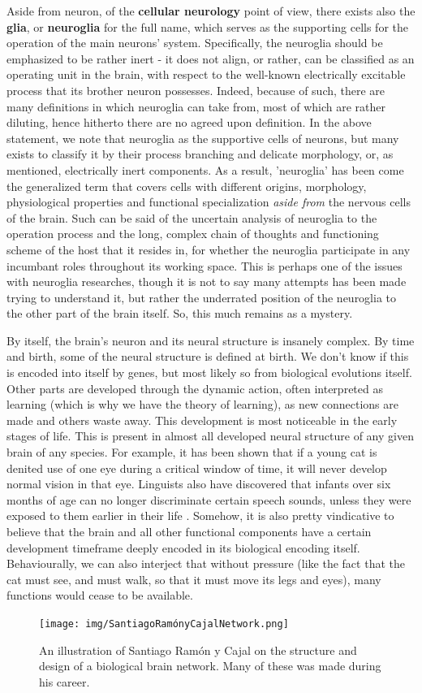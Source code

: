 Aside from neuron, of the \textbf{cellular neurology} point of view, there exists also the \textbf{glia}, or \textbf{neuroglia} for the full name, which serves as the supporting cells for the operation of the main neurons' system. Specifically, the neuroglia should be emphasized to be rather inert - it does not align, or rather, can be classified as an operating unit in the brain, with respect to the well-known electrically excitable process that its brother neuron possesses. Indeed, because of such, there are many definitions in which neuroglia can take from, most of which are rather diluting, hence hitherto there are no agreed upon definition. In the above statement, we note that neuroglia as the supportive cells of neurons, but many exists to classify it by their process branching and delicate morphology, or, as mentioned, electrically inert components. As a result, 'neuroglia' has been come the generalized term that covers cells with different origins, morphology, physiological properties and functional specialization \textit{aside from} the nervous cells of the brain. Such can be said of the uncertain analysis of neuroglia to the operation process and the long, complex chain of thoughts and functioning scheme of the host that it resides in, for whether the neuroglia participate in any incumbant roles throughout its working space. This is perhaps one of the issues with neuroglia researches, though it is not to say many attempts has been made trying to understand it, but rather the underrated position of the neuroglia to the other part of the brain itself. So, this much remains as a mystery. 

By itself, the brain's neuron and its neural structure is insanely complex. By time and birth, some of the neural structure is defined at birth. We don't know if this is encoded into itself by genes, but most likely so from biological evolutions itself. Other parts are developed through the dynamic action, often interpreted as learning (which is why we have the theory of learning), as new connections are made and others waste away. This development is most noticeable in the early stages of life. This is present in almost all developed neural structure of any given brain of any species. For example, it has been shown that if a young cat is denited use of one eye during a critical window of time, it will never develop normal vision in that eye. Linguists also have discovered that infants over six months of age can no longer discriminate certain speech sounds, unless they were exposed to them earlier in their life \cite{WERKER198449}. Somehow, it is also pretty vindicative to believe that the brain and all other functional components have a certain development timeframe deeply encoded in its biological encoding itself. Behaviourally, we can also interject that without pressure (like the fact that the cat must see, and must walk, so that it must move its legs and eyes), many functions would cease to be available. 
\begin{figure}[h!]
    \centering
    \texttt{[image: img/SantiagoRamónyCajalNetwork.png]}
    \caption{An illustration of Santiago Ramón y Cajal on the structure and design of a biological brain network. Many of these was made during his career.}
\end{figure}

